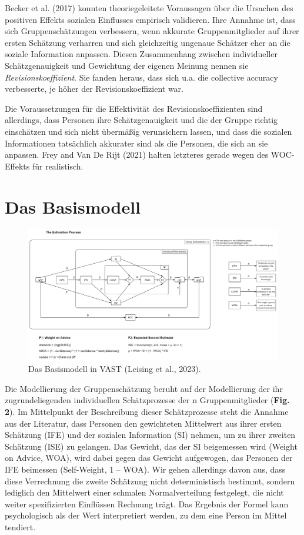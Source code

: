 \documentclass[
  man,mask,floatsintext]{apa6}
\begin{document}
Becker et al. (2017) konnten theoriegeleitete Voraussagen über die Ursachen des positiven Effekts sozialen Einflusses empirisch validieren. Ihre Annahme ist, dass sich Gruppenschätzungen verbessern, wenn akkurate Gruppenmitglieder auf ihrer ersten Schätzung verharren und sich gleichzeitig ungenaue Schätzer eher an die soziale Information anpassen. Diesen Zusammenhang zwischen individueller Schätzgenauigkeit und Gewichtung der eigenen Meinung nennen sie \emph{Revisionskoeffizient}. Sie fanden heraus, dass sich u.a. die collective accuracy verbesserte, je höher der Revisionskoeffizient war.

Die Voraussetzungen für die Effektivität des Revisionskoeffizienten sind allerdings, dass Personen ihre Schätzgenauigkeit und die der Gruppe richtig einschätzen und sich nicht übermäßig verunsichern lassen, und dass die sozialen Informationen tatsächlich akkurater sind als die Personen, die sich an sie anpassen. Frey and Van De Rijt (2021) halten letzteres gerade wegen des WOC-Effekts für realistisch.

\section{Das Basismodell}\label{das-basismodell}



\begin{figure}
\centering
\includegraphics{Abbildungen/VAST_Modell.png}
\caption{\label{fig:my-figure2}Das Basismodell in VAST (Leising et al., 2023).}
\end{figure}

Die Modellierung der Gruppenschätzung beruht auf der Modellierung der ihr zugrundeliegenden individuellen Schätzprozesse der n Gruppenmitglieder (\textbf{Fig. 2}). Im Mittelpunkt der Beschreibung dieser Schätzprozesse steht die Annahme aus der Literatur, dass Personen den gewichteten Mittelwert aus ihrer ersten Schätzung (IFE) und der sozialen Information (SI) nehmen, um zu ihrer zweiten Schätzung (ISE) zu gelangen. Das Gewicht, das der SI beigemessen wird (Weight on Advice, WOA), wird dabei gegen das Gewicht aufgewogen, das Personen der IFE beimessen (Self-Weight, 1 -- WOA). Wir gehen allerdings davon aus, dass diese Verrechnung die zweite Schätzung nicht deterministisch bestimmt, sondern lediglich den Mittelwert einer schmalen Normalverteilung festgelegt, die nicht weiter spezifizierten Einflüssen Rechnung trägt. Das Ergebnis der Formel kann psychologisch als der Wert interpretiert werden, zu dem eine Person im Mittel tendiert.
\end{document}
